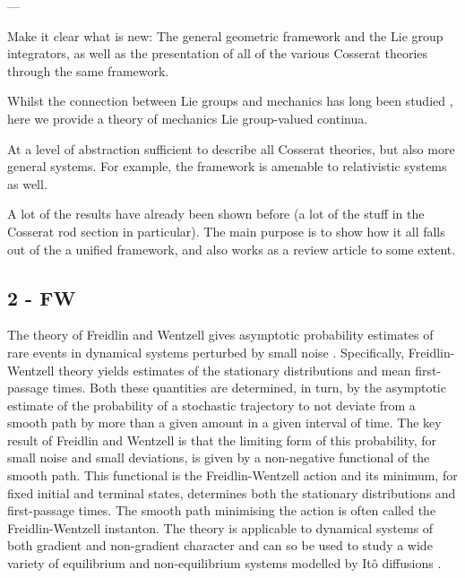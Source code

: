 \documentclass[withindex,glossary,techreport]{cam-thesis}
\begin{document}
---

Make it clear what is new: The general geometric framework and the Lie group integrators, as well as the presentation of all of the various Cosserat theories through the same framework.

Whilst the connection between Lie groups and mechanics has long been studied \citep{marsdenIntroductionMechanicsSymmetry2013}, here we provide a theory of mechanics Lie group-valued continua.

At a level of abstraction sufficient to describe all Cosserat theories, but also more general systems. For example, the framework is amenable to relativistic systems as well.

A lot of the results have already been shown before (a lot of the stuff in the Cosserat rod section in particular). The main purpose is to show how it all falls out of the a unified framework, and also works as a review article to some extent.



\subsection{2 - FW}

The theory of Freidlin and Wentzell \citep{ventselSMALLRANDOMPERTURBATIONS1970}
gives asymptotic probability estimates of rare events in dynamical
systems perturbed by small noise \citep{bolhuis2002transition, allen2005sampling, allen2009forward, ebener2019instanton}.
Specifically, Freidlin-Wentzell theory yields estimates of the stationary
distributions and mean first-passage times. Both these quantities
are determined, in turn, by the asymptotic estimate of the probability
of a stochastic trajectory to not deviate from a smooth path by more
than a given amount in a given interval of time. The key result of
Freidlin and Wentzell is that the limiting form of this probability,
for small noise and small deviations, is given by a non-negative functional
of the smooth path. This functional is the Freidlin-Wentzell action
and its minimum, for fixed initial and terminal states, determines
both the stationary distributions and first-passage times. The smooth
path minimising the action is often called the Freidlin-Wentzell instanton.
The theory is applicable to dynamical systems of both gradient and
non-gradient character and can so be used to study a wide variety
of equilibrium and non-equilibrium systems modelled by Itô diffusions
\citep{paninski2006most,huang2012molecular, bouchet2016generalisation, maier1996scaling, wolynes1995navigating, noltingBallsCupsQuasipotentials2016, mangel1994barrier, gardner2000construction, demarco2001phase, nelson1987stochastic}.
\end{document}
